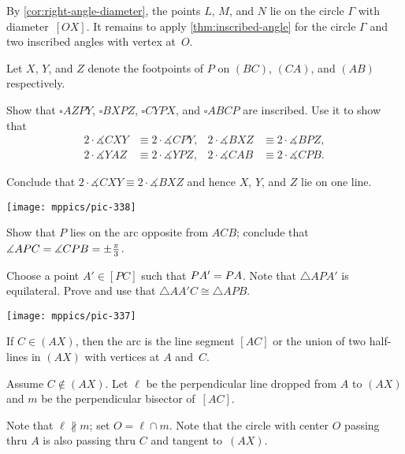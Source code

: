 \begin{multicols}{2}
By \ref{cor:right-angle-diameter},
the points $L$, $M$, and $N$ lie on the circle $\Gamma$ with diameter~$[OX]$.
It remains to apply \ref{thm:inscribed-angle} for the circle $\Gamma$ 
and two inscribed angles with vertex at~$O$.

Let $X$, $Y$, and $Z$ denote the footpoints of $P$ on $(BC)$, $(CA)$, and $(AB)$ respectively.

Show that $\square AZPY$, $\square BXPZ$, $\square CYPX$, and $\square ABCP$ are inscribed.
Use it to show that
\begin{align*}
2\cdot \measuredangle CXY&\equiv 2\cdot \measuredangle CPY,
&
2\cdot \measuredangle BXZ&\equiv 2\cdot \measuredangle BPZ,
\\
2\cdot \measuredangle YAZ&\equiv 2\cdot \measuredangle YPZ,
&
2\cdot \measuredangle CAB&\equiv 2\cdot \measuredangle CPB.
\end{align*}

Conclude that 
$2\cdot \measuredangle CXY\equiv 2\cdot \measuredangle BXZ$
and hence $X$, $Y$, and $Z$ lie on one line.

\begin{Figure}
\centering
\texttt{[image: mppics/pic-338]}
\end{Figure}



Show that $P$ lies on the arc opposite from $ACB$;
conclude that
$\measuredangle APC\z=\measuredangle CPB\z=\pm\tfrac\pi3$.

Choose a point $A'\in [PC]$ such that $PA'\z=PA$.
Note that $\triangle APA'$ is equilateral.
Prove and use that $\triangle AA'C\cong \triangle APB$.

\begin{Figure}
\centering
\texttt{[image: mppics/pic-337]}
\end{Figure}

If $C\in (AX)$, then the arc is the line segment $[AC]$ or the union of two half-lines in $(AX)$ with vertices at $A$ and~$C$.

Assume $C\notin (AX)$.
Let $\ell$ be the perpendicular line dropped from $A$ to $(AX)$ and $m$ be the perpendicular bisector of~$[AC]$.

Note that $\ell\nparallel m$;
set $O=\ell\cap m$.
Note that the circle with center $O$ passing thru $A$ is also passing thru $C$ and tangent to~$(AX)$.



\end{multicols}
